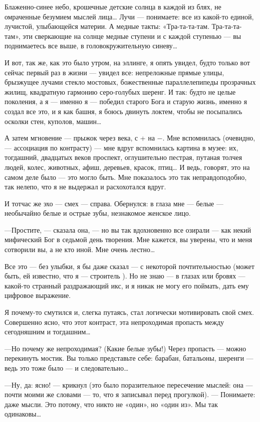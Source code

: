 \documentclass[11pt,openany]{book}
\begin{document}
Блаженно-синее небо, крошечные детские солнца в каждой из блях, не омраченные безумием мыслей лица\ldots{} Лучи --- понимаете: все из какой-то единой, лучистой, улыбающейся материи. А медные такты: «Тра-та-та-там. Тра-та-та-там», эти сверкающие на солнце медные ступени и с каждой ступенью --- вы поднимаетесь все выше, в головокружительную синеву\ldots{}

И вот, так же, как это было утром, на эллинге, я опять увидел, будто только вот сейчас первый раз в жизни --- увидел все: непреложные прямые улицы, брызжущее лучами стекло мостовых, божественные параллелепипеды прозрачных жилищ, квадратную гармонию серо-голубых шеренг. И так: будто не целые поколения, а я --- именно я --- победил старого Бога и старую жизнь, именно я создал все это, и я как башня, я боюсь двинуть локтем, чтобы не посыпались осколки стен, куполов, машин\ldots{}

А затем мгновение --- прыжок через века, с + на −. Мне вспомнилась (очевидно, --- ассоциация по контрасту) --- мне вдруг вспомнилась картина в музее: их, тогдашний, двадцатых веков проспект, оглушительно пестрая, путаная толчея людей, колес, животных, афиш, деревьев, красок, птиц\ldots{} И ведь, говорят, это на самом деле было --- это могло быть. Мне показалось это так неправдоподобно, так нелепо, что я не выдержал и расхохотался вдруг.

И тотчас же эхо --- смех --- справа. Обернулся: в глаза мне --- белые --- необычайно белые и острые зубы, незнакомое женское лицо.

---Простите, --- сказала она, --- но вы так вдохновенно все озирали --- как некий мифический Бог в седьмой день творения. Мне кажется, вы уверены, что и меня сотворили вы, а не кто иной. Мне очень лестно\ldots{}

Все это --- без улыбки, я бы даже сказал --- с некоторой почтительностью (может быть, ей известно, что я --- строитель ). Но не знаю --- в глазах или бровях --- какой-то странный раздражающий икс, и я никак не могу его поймать, дать ему цифровое выражение.

Я почему-то смутился и, слегка путаясь, стал логически мотивировать свой смех. Совершенно ясно, что этот контраст, эта непроходимая пропасть между сегодняшним и тогдашним\ldots{}

---Но почему же непроходимая? (Какие белые зубы!) Через пропасть --- можно перекинуть мостик. Вы только представьте себе: барабан, батальоны, шеренги --- ведь это тоже было --- и следовательно\ldots{}

---Ну, да: ясно! --- крикнул (это было поразительное пересечение мыслей: она --- почти моими же словами --- то, что я записывал перед прогулкой). --- Понимаете: даже мысли. Это потому, что никто не «один», но «один из». Мы так одинаковы\ldots{}
\end{document}
